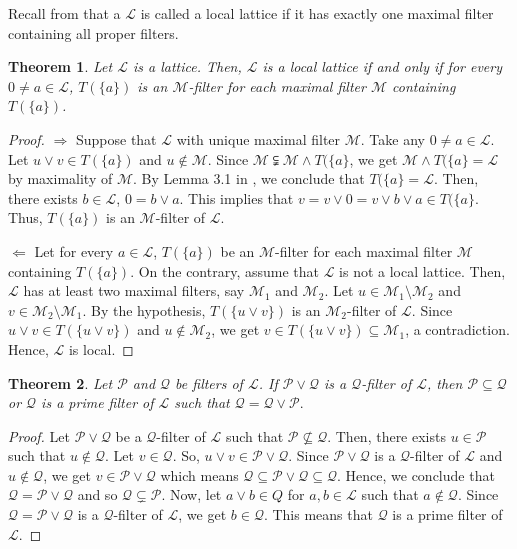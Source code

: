 \documentclass[preprint,review,10pt]{amsart}
\newtheorem{theorem}{Theorem}[section]
\theoremstyle{definition}
\theoremstyle{remark}
\numberwithin{equation}{section}
\begin{document}
Recall from \cite{Atani6} that a
$\mathcal{L}$ is called a local lattice if it has exactly one maximal ﬁlter  containing all proper ﬁlters. 
 \begin{theorem} \label{4}
 Let  $\mathcal{L}$ is a  lattice. Then, $\mathcal{L}$ is a local lattice if and only if for every $ 0 \neq  a \in \mathcal{L}$, $T(\{a\})$ is an $\mathcal{M}$-filter for each maximal filter $\mathcal{M}$ containing $T(\{a\})$.
 \end{theorem}
 \begin{proof}
 $\Longrightarrow$  Suppose that $\mathcal{L}$ with unique maximal filter $\mathcal{M}$. Take any $ 0 \neq  a \in \mathcal{L}$. Let $ u \vee v \in T(\{a\})$ and $u \notin  \mathcal{M}$. Since $ \mathcal{M} \subsetneqq \mathcal{M} \wedge T(\{a\}$, we get $\mathcal{M} \wedge T(\{a\}= \mathcal{L}$ by maximality of $\mathcal{M}$. By Lemma 3.1 in \cite{Atani7}, we conclude that $T(\{a\}= \mathcal{L}$. Then, there exists $b \in  \mathcal{L}$, $0 =b \vee a$. This implies that $v=v \vee 0=v \vee b \vee a \in T(\{a\}$. Thus, $T(\{a\})$ is an $\mathcal{M}$-filter of $\mathcal{L}$.
 
$\Longleftarrow$  Let for every $ a \in \mathcal{L}$, $T(\{a\})$ be  an $\mathcal{M}$-filter for each maximal filter $\mathcal{M}$ containing $T(\{a\})$. On the contrary, assume that $\mathcal{L}$ is not a local lattice. Then, $\mathcal{L}$ has at least two maximal filters, say $\mathcal{M}_1$ and $\mathcal{M}_2$. Let  $u \in \mathcal{M}_1 \setminus  \mathcal{M}_2$ and $v \in \mathcal{M}_2 \setminus  \mathcal{M}_1$. By the hypothesis,   $T(\{u \vee v\})$ is an $\mathcal{M}_2$-filter of $\mathcal{L}$. Since $u \vee v \in T(\{u \vee v\})$ and $u \notin \mathcal{M}_2$, we get $v \in T(\{u \vee v\}) \subseteq \mathcal{M}_1$, a contradiction. Hence, $\mathcal{L}$ is local.
 \end{proof}
 \begin{theorem} \label{5}
Let $\mathcal{P}$ and $\mathcal{Q}$ be filters of $\mathcal{L}$. If $\mathcal{P} \vee \mathcal{Q}$ is a $\mathcal{Q}$-filter of $\mathcal{L}$, then $\mathcal{P} \subseteq \mathcal{Q}$ or $\mathcal{Q}$ is a prime filter of $\mathcal{L}$ such that  $\mathcal{Q}=\mathcal{Q} \vee \mathcal{P}.$
\end{theorem}
\begin{proof}
Let $\mathcal{P} \vee \mathcal{Q}$ be a $\mathcal{Q}$-filter of $\mathcal{L}$ such that $\mathcal{P} \nsubseteq \mathcal{Q}$.  Then, there exists  $u \in \mathcal{P}$ such that $u \notin \mathcal{Q}$. Let $v \in \mathcal{Q}$. So, $u \vee v  \in \mathcal{P} \vee \mathcal{Q}$. Since   $\mathcal{P} \vee \mathcal{Q}$ is a $\mathcal{Q}$-filter of $\mathcal{L}$ and $u \notin \mathcal{Q}$, we get $v \in \mathcal{P} \vee \mathcal{Q}$ which means $\mathcal{Q} \subseteq  \mathcal{P} \vee \mathcal{Q} \subseteq  \mathcal{Q}$. Hence, we conclude that $\mathcal{Q}=\mathcal{P} \vee \mathcal{Q}$ and so $\mathcal{Q} \varsubsetneq  \mathcal{P}$. Now, let $a \vee b \in Q$ for $a,b \in \mathcal{L}$ such that $a \notin \mathcal{Q}$. Since $\mathcal{Q}=\mathcal{P} \vee \mathcal{Q}$ is a $\mathcal{Q}$-filter of $\mathcal{L}$, we get   $b  \in  \mathcal{Q}$.  This means that $\mathcal{Q}$ is a prime filter of $\mathcal{L}$.
\end{proof}
\end{document}
